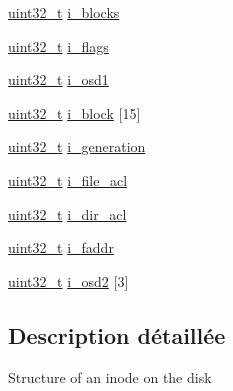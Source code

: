 \begin{DoxyCompactItemize}
\item 
\hyperlink{kernel_2include_2types_8h_a33594304e786b158f3fb30289278f5af}{uint32\-\_\-t} \hyperlink{structext2__inode_a6e5b258ebc92b6ae75c61572c60cbb4b}{i\-\_\-blocks}
\item 
\hyperlink{kernel_2include_2types_8h_a33594304e786b158f3fb30289278f5af}{uint32\-\_\-t} \hyperlink{structext2__inode_a2037da1edbe1d421dd4453f84cb973e6}{i\-\_\-flags}
\item 
\hyperlink{kernel_2include_2types_8h_a33594304e786b158f3fb30289278f5af}{uint32\-\_\-t} \hyperlink{structext2__inode_ab06178218f59df43b3d80ad53edc6105}{i\-\_\-osd1}
\item 
\hyperlink{kernel_2include_2types_8h_a33594304e786b158f3fb30289278f5af}{uint32\-\_\-t} \hyperlink{structext2__inode_a3e2386992eeb6a3b6aa5e282c50221c7}{i\-\_\-block} \mbox{[}15\mbox{]}
\item 
\hyperlink{kernel_2include_2types_8h_a33594304e786b158f3fb30289278f5af}{uint32\-\_\-t} \hyperlink{structext2__inode_a551df9f3b8f61eb5840eeeb5921c69fb}{i\-\_\-generation}
\item 
\hyperlink{kernel_2include_2types_8h_a33594304e786b158f3fb30289278f5af}{uint32\-\_\-t} \hyperlink{structext2__inode_aee0fba48998e7d27b836d04ee53e4463}{i\-\_\-file\-\_\-acl}
\item 
\hyperlink{kernel_2include_2types_8h_a33594304e786b158f3fb30289278f5af}{uint32\-\_\-t} \hyperlink{structext2__inode_a11c2793c33c6ce3f13a5f046e246fd47}{i\-\_\-dir\-\_\-acl}
\item 
\hyperlink{kernel_2include_2types_8h_a33594304e786b158f3fb30289278f5af}{uint32\-\_\-t} \hyperlink{structext2__inode_a3c921d50835f4869a08444b7e8b01043}{i\-\_\-faddr}
\item 
\hyperlink{kernel_2include_2types_8h_a33594304e786b158f3fb30289278f5af}{uint32\-\_\-t} \hyperlink{structext2__inode_a6f05264ef1f6a42a6975a858d1aa17c3}{i\-\_\-osd2} \mbox{[}3\mbox{]}
\end{DoxyCompactItemize}


\subsection{Description détaillée}
Structure of an inode on the disk 

